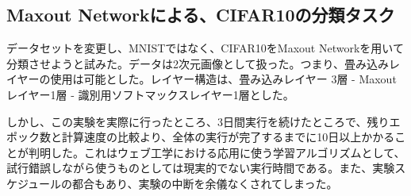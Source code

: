 \subsection{Maxout Networkによる、CIFAR10の分類タスク}
データセットを変更し、MNISTではなく、CIFAR10をMaxout Networkを用いて分類させようと試みた。データは2次元画像として扱った。つまり、畳み込みレイヤーの使用は可能とした。レイヤー構造は、畳み込みレイヤー 3層 - Maxout レイヤー1層 - 識別用ソフトマックスレイヤー1層とした。\par
しかし、この実験を実際に行ったところ、3日間実行を続けたところで、残りエポック数と計算速度の比較より、全体の実行が完了するまでに10日以上かかることが判明した。これはウェブ工学における応用に使う学習アルゴリズムとして、試行錯誤しながら使うものとしては現実的でない実行時間である。また、実験スケジュールの都合もあり、実験の中断を余儀なくされてしまった。%